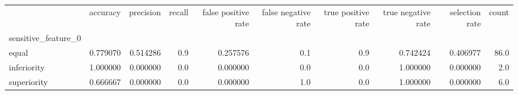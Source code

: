 \begin{tabular}{lrrrrrrrrr}
\toprule
{} &  accuracy &  precision &  recall &  false positive rate &  false negative rate &  true positive rate &  true negative rate &  selection rate &  count \\
sensitive\_feature\_0 &           &            &         &                      &                      &                     &                     &                 &        \\
\midrule
equal               &  0.779070 &   0.514286 &     0.9 &             0.257576 &                  0.1 &                 0.9 &            0.742424 &        0.406977 &   86.0 \\
inferiority         &  1.000000 &   0.000000 &     0.0 &             0.000000 &                  0.0 &                 0.0 &            1.000000 &        0.000000 &    2.0 \\
superiority         &  0.666667 &   0.000000 &     0.0 &             0.000000 &                  1.0 &                 0.0 &            1.000000 &        0.000000 &    6.0 \\
\bottomrule
\end{tabular}

